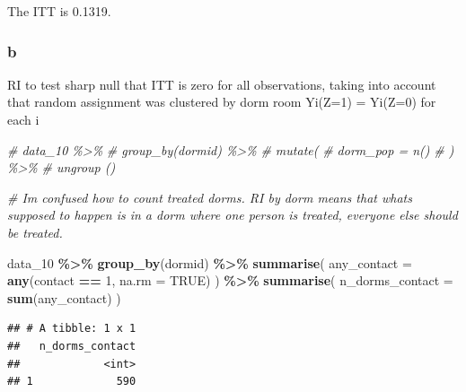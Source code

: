 \documentclass[
]{article}
\newenvironment{Shaded}{\begin{snugshade}}{\end{snugshade}}
\newcommand{\AttributeTok}[1]{\textcolor[rgb]{0.13,0.29,0.53}{#1}}
\newcommand{\CommentTok}[1]{\textcolor[rgb]{0.56,0.35,0.01}{\textit{#1}}}
\newcommand{\ConstantTok}[1]{\textcolor[rgb]{0.56,0.35,0.01}{#1}}
\newcommand{\DecValTok}[1]{\textcolor[rgb]{0.00,0.00,0.81}{#1}}
\newcommand{\FunctionTok}[1]{\textcolor[rgb]{0.13,0.29,0.53}{\textbf{#1}}}
\newcommand{\NormalTok}[1]{#1}
\newcommand{\OtherTok}[1]{\textcolor[rgb]{0.56,0.35,0.01}{#1}}
\newcommand{\SpecialCharTok}[1]{\textcolor[rgb]{0.81,0.36,0.00}{\textbf{#1}}}
\begin{document}
The ITT is 0.1319.

\subsubsection{b}\label{b-4}

RI to test sharp null that ITT is zero for all observations, taking into
account that random assignment was clustered by dorm room Yi(Z=1) =
Yi(Z=0) for each i

\begin{Shaded}
\begin{Highlighting}[]
\CommentTok{\# data\_10 \%\textgreater{}\%}
\CommentTok{\#   group\_by(dormid) \%\textgreater{}\%}
\CommentTok{\#   mutate(}
\CommentTok{\#     dorm\_pop = n()}
\CommentTok{\#   ) \%\textgreater{}\%}
\CommentTok{\#   ungroup ()}

\CommentTok{\# I\textquotesingle{}m confused how to count treated dorms. RI by dorm means that what\textquotesingle{}s supposed to happen is in a dorm where one person is treated, everyone else should be treated. }

\NormalTok{data\_10 }\SpecialCharTok{\%\textgreater{}\%}
  \FunctionTok{group\_by}\NormalTok{(dormid) }\SpecialCharTok{\%\textgreater{}\%}
  \FunctionTok{summarise}\NormalTok{(}
    \AttributeTok{any\_contact =} \FunctionTok{any}\NormalTok{(contact }\SpecialCharTok{==} \DecValTok{1}\NormalTok{, }\AttributeTok{na.rm =} \ConstantTok{TRUE}\NormalTok{)}
\NormalTok{  ) }\SpecialCharTok{\%\textgreater{}\%}
  \FunctionTok{summarise}\NormalTok{(}
    \AttributeTok{n\_dorms\_contact =} \FunctionTok{sum}\NormalTok{(any\_contact)}
\NormalTok{  )}
\end{Highlighting}
\end{Shaded}

\begin{verbatim}
## # A tibble: 1 x 1
##   n_dorms_contact
##             <int>
## 1             590
\end{verbatim}

\begin{Shaded}
\end{Shaded}
\end{document}
